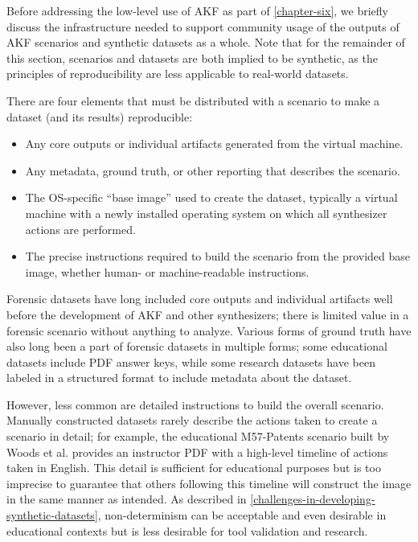 Before addressing the low-level use of AKF as part of \autoref{chapter-six}, we briefly discuss the infrastructure needed to
support community usage of the outputs of AKF scenarios and synthetic
datasets as a whole. Note that for the remainder of this section,
scenarios and datasets are both implied to be synthetic, as the
principles of reproducibility are less applicable to real-world
datasets.

There are four elements that must be distributed with a scenario to make
a dataset (and its results) reproducible:

\begin{itemize}
\tightlist
\item
  Any core outputs or individual artifacts generated from the virtual
  machine.
\item
  Any metadata, ground truth, or other reporting that describes the
  scenario.
\item
  The OS-specific ``base image'' used to create the dataset, typically a
  virtual machine with a newly installed operating system on which all
  synthesizer actions are performed.
\item
  The precise instructions required to build the scenario from the
  provided base image, whether human- or machine-readable instructions.
\end{itemize}

Forensic datasets have long included core outputs and individual
artifacts well before the development of AKF and other synthesizers;
there is limited value in a forensic scenario without anything to
analyze. Various forms of ground truth have also long been a part of
forensic datasets in multiple forms; some educational datasets include
PDF answer keys, while some research datasets have been labeled in a
structured format to include metadata about the dataset.

However, less common are detailed instructions to build the overall
scenario. Manually constructed datasets rarely describe the actions
taken to create a scenario in detail; for example, the educational
M57-Patents scenario built by Woods et al.
\cite{woodsCreatingRealisticCorpora2011} provides an instructor PDF
with a high-level timeline of actions taken in English. This detail is
sufficient for educational purposes but is too imprecise to guarantee
that others following this timeline will construct the image in the same
manner as intended. As described in \autoref{challenges-in-developing-synthetic-datasets}, non-determinism can be
acceptable and even desirable in educational contexts but is less
desirable for tool validation and research.

